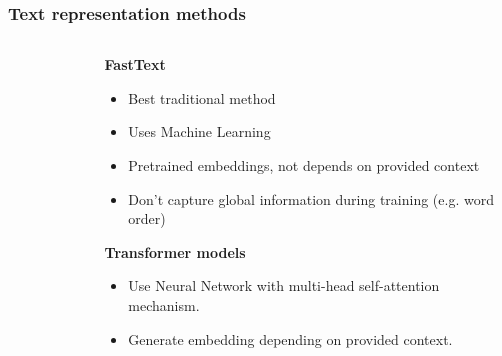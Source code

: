 \documentclass{beamer}
\begin{document}
\begin{frame}[t]
  \frametitle{Text representation methods}
  \begin{columns}[onlytextwidth]
    \begin{column}{0.5\textwidth}
      \begin{figure}
        
      \end{figure}
    \end{column}
    \begin{column}{0.5\textwidth}
      \textcolor{cvut_navy}{\textbf{FastText}}
      \begin{itemize}
      \item Best traditional method
      \item Uses Machine Learning
      \item Pretrained embeddings, not depends on provided context
      \item Don't capture global information during training (e.g. word order)
      \end{itemize}
      \textcolor{cvut_navy}{\textbf{Transformer models}}
      \begin{itemize}
      \item Use Neural Network with multi-head self-attention mechanism.
      \item Generate embedding depending on provided context.
      \end{itemize}
    \end{column}
  \end{columns}
\end{frame}
\end{document}
